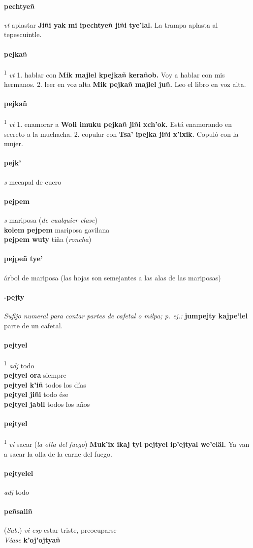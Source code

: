 \documentclass{scrbook}
\newcommand{\entry}[1]{\paragraph{#1}}
\newcommand{\onedefinition}[1]{#1.}
\newcommand{\defsuperscript}[1]{\textsuperscript{1}}
\newcommand{\nontranslationdef}[1]{\textit{#1}}
\newcommand{\partofspeech}[1]{\textit{#1}}
\newcommand{\spanishtranslation}[1]{#1}
\newcommand{\clarification}[1]{(\textit{#1})}
\newcommand{\cholexample}[1]{\textbf{#1}}
\newcommand{\exampletranslation}[1]{#1}
\newcommand{\alsosee}[1]{\\\textit{Véase} \textbf{#1}}
\newcommand{\relevantdialect}[1]{(\textit{#1})}
\newcommand{\secondaryentry}[1]{\\\textbf{#1}}
\newcommand{\secondtranslation}[1]{#1}
\begin{document}
\begin{multicols}{2}
\entry{pechtyeñ}
\partofspeech{vt}
\spanishtranslation{aplastar}
\cholexample{Jiñi yak mi ipechtyeñ jiñi tye'lal.}
\exampletranslation{La trampa aplasta al tepescuintle.}

\entry{pejkañ}
\defsuperscript{1}
\partofspeech{vt}
\onedefinition{1}
\spanishtranslation{hablar con}
\cholexample{Mik majlel kpejkañ kerañob.}
\exampletranslation{Voy a hablar con mis hermanos.}
\onedefinition{2}
\spanishtranslation{leer en voz alta}
\cholexample{Mik pejkañ majlel juñ.}
\exampletranslation{Leo el libro en voz alta.}

\entry{pejkañ}
\defsuperscript{2}
\partofspeech{vt}
\onedefinition{1}
\spanishtranslation{enamorar a}
\cholexample{Woli imuku pejkañ jiñi xch'ok.}
\exampletranslation{Está enamorando en secreto a la muchacha.}
\onedefinition{2}
\spanishtranslation{copular con}
\cholexample{Tsa' ipejka jiñi x'ixik.}
\exampletranslation{Copuló con la mujer.}

\entry{pejk'}
\partofspeech{s}
\spanishtranslation{mecapal de cuero}

\entry{pejpem}
\partofspeech{s}
\spanishtranslation{mariposa}
\clarification{de cualquier clase}
\secondaryentry{kolem pejpem}
\secondtranslation{mariposa gavilana}
\secondaryentry{pejpem wuty}
\secondtranslation{tiña}
\clarification{roncha}

\entry{pejpeñ tye'}
\spanishtranslation{árbol de mariposa (las hojas son semejantes a las alas de las mariposas)}

\entry{-pejty}
\nontranslationdef{Sufijo numeral para contar partes de cafetal o milpa; p. ej.:}
\cholexample{jumpejty kajpe'lel}
\exampletranslation{parte de un cafetal.}

\entry{pejtyel}
\defsuperscript{1}
\partofspeech{adj}
\spanishtranslation{todo}
\secondaryentry{pejtyel ora}
\secondtranslation{siempre}
\secondaryentry{pejtyel k'iñ}
\secondtranslation{todos los días}
\secondaryentry{pejtyel jiñi}
\secondtranslation{todo ése}
\secondaryentry{pejtyel jabil}
\secondtranslation{todos los años}

\entry{pejtyel}
\defsuperscript{2}
\partofspeech{vi}
\spanishtranslation{sacar}
\clarification{la olla del fuego}
\cholexample{Muk'ix ikaj tyi pejtyel ip'ejtyal we'eläl.}
\exampletranslation{Ya van a sacar la olla de la carne del fuego.}

\entry{pejtyelel}
\partofspeech{adj}
\spanishtranslation{todo}

\entry{peñsaliñ}
\relevantdialect{Sab.}
\partofspeech{vi esp}
\spanishtranslation{estar triste, preocuparse}
\alsosee{k'oj'ojtyañ}


\end{multicols}
\end{document}
